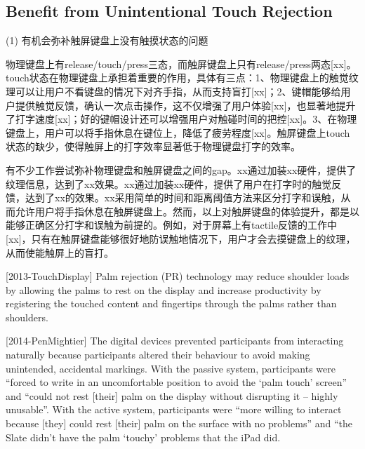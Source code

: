 
\subsection{Benefit from Unintentional Touch Rejection}

(1) 有机会弥补触屏键盘上没有触摸状态的问题

物理键盘上有release/touch/press三态，而触屏键盘上只有release/press两态[xx]。touch状态在物理键盘上承担着重要的作用，具体有三点：1、物理键盘上的触觉纹理可以让用户不看键盘的情况下对齐手指，从而支持盲打[xx]；2、键帽能够给用户提供触觉反馈，确认一次点击操作，这不仅增强了用户体验[xx]，也显著地提升了打字速度[xx]；好的键帽设计还可以增强用户对触碰时间的把控[xx]。3、在物理键盘上，用户可以将手指休息在键位上，降低了疲劳程度[xx]。触屏键盘上touch状态的缺少，使得触屏上的打字效率显著低于物理键盘打字的效率。

有不少工作尝试弥补物理键盘和触屏键盘之间的gap。xx通过加装xx硬件，提供了纹理信息，达到了xx效果。xx通过加装xx硬件，提供了用户在打字时的触觉反馈，达到了xx的效果。xx采用简单的时间和距离阈值方法来区分打字和误触，从而允许用户将手指休息在触屏键盘上。然而，以上对触屏键盘的体验提升，都是以能够正确区分打字和误触为前提的。例如，对于屏幕上有tactile反馈的工作中[xx]，只有在触屏键盘能够很好地防误触地情况下，用户才会去摸键盘上的纹理，从而使能触屏上的盲打。

[2013-TouchDisplay]
Palm rejection (PR) technology may reduce shoulder loads by allowing the palms to rest on the display and increase productivity by registering the touched content and fingertips through the palms rather than shoulders.

[2014-PenMightier]
The digital devices prevented participants from interacting naturally because participants altered their behaviour to avoid making unintended, accidental markings. With the passive system, participants were “forced to write in an
uncomfortable position to avoid the ‘palm touch’ screen” and
“could not rest [their] palm on the display without disrupting it –
highly unusable”. With the active system, participants were “more
willing to interact because [they] could rest [their] palm on the
surface with no problems” and “the Slate didn’t have the palm
‘touchy’ problems that the iPad did.

